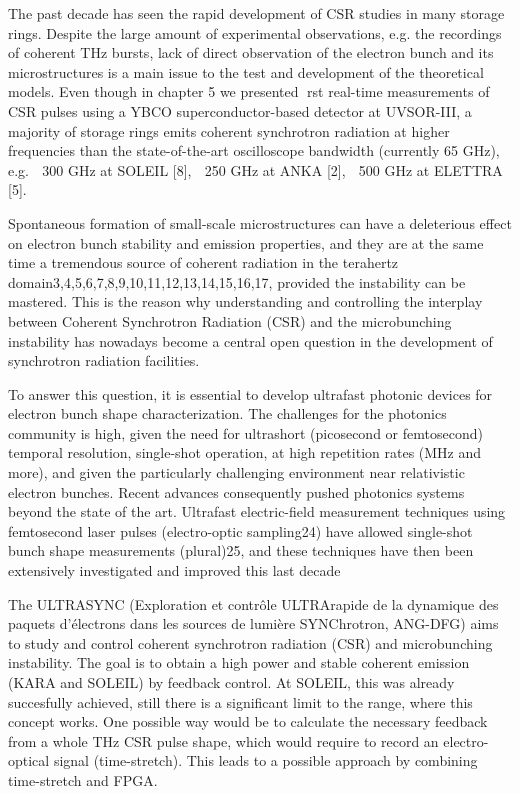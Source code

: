 The past decade has seen the rapid development of CSR studies in many storage
rings. Despite the large amount of experimental observations, e.g. the recordings
of coherent THz bursts, lack of direct observation of the electron bunch and its
microstructures is a main issue to the test and development of the theoretical models.
Even though in chapter 5 we presented rst real-time measurements of CSR
pulses using a YBCO superconductor-based detector at UVSOR-III, a majority
of storage rings emits coherent synchrotron radiation at higher frequencies than
the state-of-the-art oscilloscope bandwidth (currently 65 GHz), e.g.  300 GHz
at SOLEIL [8],  250 GHz at ANKA [2],  500 GHz at ELETTRA [5].

Spontaneous formation of small-scale microstructures can have a deleterious effect on electron bunch stability and emission properties, and they are at the same time a tremendous source of coherent radiation in the terahertz domain3,4,5,6,7,8,9,10,11,12,13,14,15,16,17, provided the instability can be mastered. This is the reason why understanding and controlling the interplay between Coherent Synchrotron Radiation (CSR) and the microbunching instability has nowadays become a central open question in the development of synchrotron radiation facilities.

To answer this question, it is essential to develop ultrafast photonic devices for electron bunch shape characterization. The challenges for the photonics community is high, given the need for ultrashort (picosecond or femtosecond) temporal resolution, single-shot operation, at high repetition rates (MHz and more), and given the particularly challenging environment near relativistic electron bunches. Recent advances consequently pushed photonics systems beyond the state of the art. Ultrafast electric-field measurement techniques using femtosecond laser pulses (electro-optic sampling24) have allowed single-shot bunch shape measurements (plural)25, and these techniques have then been extensively investigated and improved this last decade


The ULTRASYNC (Exploration et contrôle ULTRArapide de la dynamique des paquets d'électrons dans les sources de lumière SYNChrotron, ANG-DFG) aims to study and control coherent synchrotron radiation (CSR) and microbunching instability. The goal is to obtain a high power and stable coherent emission (KARA and SOLEIL) by feedback control. At SOLEIL, this was already succesfully achieved, still there is a significant limit to the range, where this concept works. One possible way would be to calculate the necessary feedback from a whole THz CSR pulse shape, which would require to record an electro-optical signal (time-stretch). This leads to a possible approach by combining time-stretch and FPGA. 

